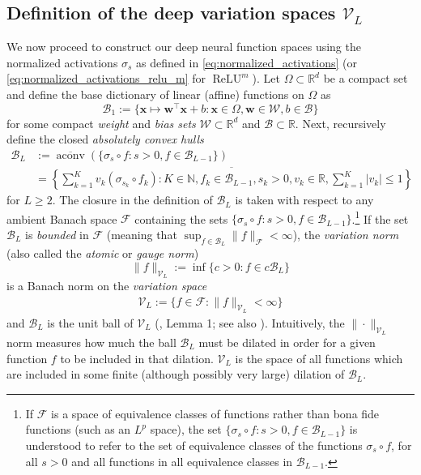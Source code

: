 \documentclass{article}
\DeclareMathOperator{\ReLU}{\mathrm{ReLU}}
\DeclareMathOperator{\aconv}{\mathrm{aconv}}
\def\vw{{\bm{w}}}
\def\vx{{\bm{x}}}
\def\cB{{\mathcal{B}}}
\def\cF{{\mathcal{F}}}
\def\cV{{\mathcal{V}}}
\def\cW{{\mathcal{W}}}
\def\bN{{\mathbb{N}}}
\newcommand{\R}{\mathbb{R}}
\begin{document}
\subsection{Definition of the deep variation spaces $\cV_L$}
We now proceed to construct our deep neural function spaces using the normalized activations $\sigma_s$ as defined in \eqref{eq:normalized_activations} (or \eqref{eq:normalized_activations_relu_m} for $\ReLU^m$). Let $\Omega \subset \mathbb{R}^d$ be a compact set and define the base dictionary of linear (affine) functions on $\Omega$ as
\begin{equation} \label{eq:B1}
    \cB_1 := \{ \vx \mapsto \vw^\top \vx + b: \vx \in \Omega, \vw \in \cW, b \in \cB \}
\end{equation}
for some compact \textit{weight} and \textit{bias sets} $\cW \subset \R^d$ and $\cB \subset \R$. Next, recursively define the closed \textit{absolutely convex hulls}
\begin{align} \label{eq:BL}
    \cB_L &:= \overline{\aconv}\left( \{ \sigma_s \circ f: s > 0, f \in \cB_{L-1} \} \right) \\ 
    &= \overline{\left\{ \sum_{k=1}^K v_k (\sigma_{s_k} \circ f_k): K \in \bN, f_k \in \cB_{L-1}, s_k > 0, v_k \in \R, \sum_{k=1}^K |v_k| \leq 1 \right\}} 
\end{align}
for $L \geq 2$. The closure in the definition of $\cB_L$ is taken with respect to any ambient Banach space $\cF$ containing the sets $\{ \sigma_s \circ f: s > 0, f \in \cB_{L-1} \}$.\footnote{If $\cF$ is a space of equivalence classes of functions rather than bona fide functions (such as an $L^p$ space), the set $\{ \sigma_s \circ f: s > 0, f \in \cB_{L-1} \}$ is  understood to refer to the set of equivalence classes of the functions $\sigma_s \circ f$, for all $s > 0$ and all functions in all equivalence classes in $\cB_{L-1}$.} If the set $\cB_L$ is \textit{bounded} in $\cF$ (meaning that $\sup_{f \in \cB_L} \| f \|_\cF < \infty$), the \textit{variation norm} (also called the \textit{atomic} or \textit{gauge norm})
\begin{equation}
    \| f \|_{\cV_L} := \inf \{ c > 0: f \in c \cB_L \}
\end{equation}
is a Banach norm on the \textit{variation space}
\begin{eqnarray*}
    \cV_L := \{ f \in \cF: \| f \|_{\cV_L} < \infty \}
\end{eqnarray*}
and $\cB_L$ is the unit ball of $\cV_L$ (\cite{siegel2023characterization}, Lemma 1; see also \cite{kurkova2002bounds,kuurkova1997dimension}). Intuitively, the $\| \cdot \|_{\cV_L}$ norm measures how much the ball $\cB_L$ must be dilated in order for a given function $f$ to be included in that dilation. $\cV_L$ is the space of all functions which are included in some finite (although possibly very large) dilation of $\cB_L$.
\end{document}
